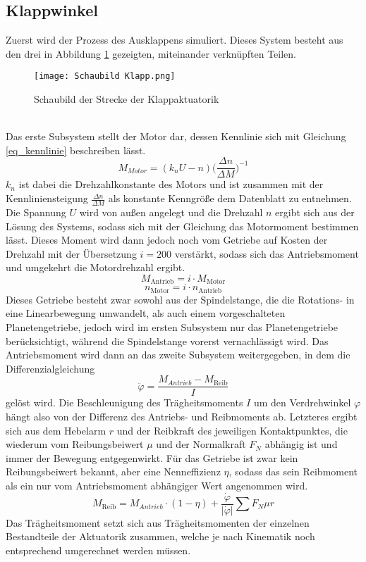 \subsection{Klappwinkel}
Zuerst wird der Prozess des Ausklappens simuliert. Dieses System besteht aus den drei in Abbildung \ref{abb_klappStrecke} gezeigten, miteinander verknüpften Teilen. 
\begin{figure}[h] 
	\centering
	\texttt{[image: Schaubild Klapp.png]}
	\caption{Schaubild der Strecke der Klappaktuatorik}
	\label{abb_klappStrecke}
\end{figure}\\
Das erste Subsystem stellt der Motor dar, dessen Kennlinie sich mit Gleichung \ref{eq_kennlinie} beschreiben lässt.
\begin{equation}\label{eq_kennlinie}
	M_{Motor} = (k_nU-n)\bigg(\frac{\Delta n}{\Delta M}\bigg)^{-1}
\end{equation}
$k_n$ ist dabei die Drehzahlkonstante des Motors und ist zusammen mit der Kennliniensteigung $\frac{\Delta n}{\Delta M}$ als konstante Kenngröße dem Datenblatt zu entnehmen. Die Spannung $U$ wird von außen angelegt und die Drehzahl $n$ ergibt sich aus der Lösung des Systems, sodass sich mit der Gleichung das Motormoment bestimmen lässt. Dieses Moment wird dann jedoch noch vom Getriebe auf Kosten der Drehzahl mit der Übersetzung $i = 200$ verstärkt, sodass sich das Antriebsmoment und umgekehrt die Motordrehzahl ergibt.
\begin{equation}
	M_\mathrm{Antrieb} = i \cdot M_\mathrm{Motor}
\end{equation}
\begin{equation}
	n_\mathrm{Motor} = i \cdot n_\mathrm{Antrieb}
\end{equation}
 Dieses Getriebe besteht zwar sowohl aus der Spindelstange, die die Rotations- in eine Linearbewegung umwandelt, als auch einem vorgeschalteten Planetengetriebe, jedoch wird im ersten Subsystem nur das Planetengetriebe berücksichtigt, während die Spindelstange vorerst vernachlässigt wird. Das Antriebsmoment wird dann an das zweite Subsystem weitergegeben, in dem die Differenzialgleichung
\begin{equation}
	\ddot{\varphi} = \frac{M_{Antrieb} - M_{\mathrm{Reib}}}{I}
\end{equation}
gelöst wird. Die Beschleunigung des Trägheitsmoments $I$ um den Verdrehwinkel $\varphi$ hängt also von der Differenz des Antriebs- und Reibmoments ab. Letzteres ergibt sich aus dem Hebelarm $r$ und der Reibkraft des jeweiligen Kontaktpunktes, die wiederum vom Reibungsbeiwert $\mu$ und der Normalkraft $F_N$ abhängig ist und immer der Bewegung entgegenwirkt. Für das Getriebe ist zwar kein Reibungsbeiwert bekannt, aber eine Nenneffizienz $\eta$, sodass das sein Reibmoment als ein nur vom Antriebsmoment abhängiger Wert angenommen wird.
\begin{equation}\label{eq_reibmoment}
	M_\mathrm{Reib} = M_{Antrieb}\cdot(1-\eta)+\frac{\dot{\varphi}}{|\dot{\varphi}|}\sum F_N \mu r
\end{equation}
Das Trägheitsmoment setzt sich aus Trägheitsmomenten der einzelnen Bestandteile der Aktuatorik zusammen, welche je nach Kinematik noch entsprechend umgerechnet werden müssen.

